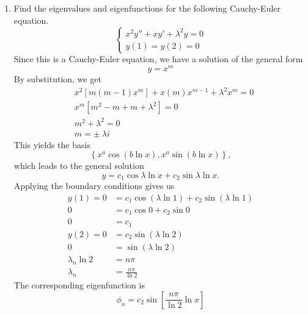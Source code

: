 \documentclass{article}
\begin{document}
\begin{enumerate}
\item Find the eigenvalues and eigenfunctions for the following Cauchy-Euler equation.
\[
\begin{cases*}
x^{2}y'' + xy' + \lambda^{2}y = 0\\
y(1) = y(2) = 0
\end{cases*}
\]
Since this is a Cauchy-Euler equation, we have a solution of the general form
\[
y = x^{m}
\]
By substitution, we get
\begin{align*}
& x^{2}\left[m(m-1)x^{m}\right] + x(m)x^{m-1} + \lambda^{2}x^{m} = 0\\
& x^{m}\left[m^{2} - m + m + \lambda^{2}\right] = 0\\
& m^{2} + \lambda^{2} = 0\\
& m = \pm\ \lambda i
\end{align*}
This yields the basis
\[
\left\{x^{a}\cos{(b\ln{x})}, x^{a}\sin{(b\ln{x})}\right\},
\]
which leads to the general solution
\[
y = c_{1}\cos{\lambda\ln{x}} + c_{2}\sin{\lambda\ln{x}}.
\]
Applying the boundary conditions gives us
\begin{align*}
y(1) = 0 &= c_{1}\cos{(\lambda\ln{1})} + c_{2}\sin{(\lambda\ln{1})}\\
0 &= c_{1}\cos{0} + c_{2}\sin{0}\\
0 &= c_{1}\\
y(2) = 0 &= c_{2}\sin{(\lambda\ln{2})}\\
0 &= \sin{(\lambda\ln{2})}\\
\lambda_{n}\ln{2} &= n\pi\\
\lambda_{n} &= \frac{n\pi}{\ln{2}}
\end{align*}
The corresponding eigenfunction is
\[
\phi_{n} = c_{2}\sin{\left[\frac{n\pi}{\ln{2}}\ln{x}\right]}
\]
\end{enumerate}
\end{document}
